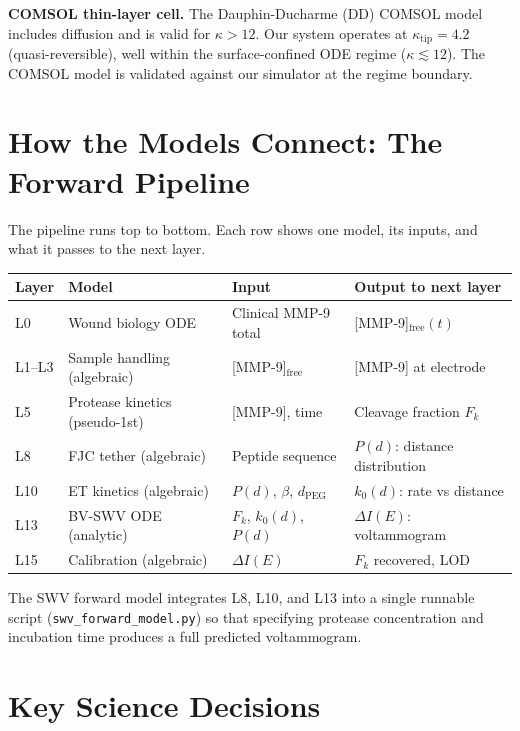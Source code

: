 \documentclass[10pt,a4paper]{article}
\numberwithin{equation}{section}
\begin{document}
\textbf{COMSOL thin-layer cell.} The Dauphin-Ducharme (DD) COMSOL model includes
diffusion and is valid for $\kappa > 12$. Our system operates at $\kappa_{\text{tip}} = 4.2$
(quasi-reversible), well within the surface-confined ODE regime ($\kappa \lesssim 12$).
The COMSOL model is validated against our simulator at the regime boundary.

\section{How the Models Connect: The Forward Pipeline}

\noindent
The pipeline runs top to bottom. Each row shows one model, its inputs, and what
it passes to the next layer.

\begin{center}
\small
\begin{tabular}{@{}llll@{}}
\toprule
\textbf{Layer} & \textbf{Model} & \textbf{Input} & \textbf{Output to next layer} \\
\midrule
L0 & Wound biology ODE & Clinical MMP-9 total & [MMP-9]$_{\text{free}}(t)$ \\
L1--L3 & Sample handling (algebraic) & [MMP-9]$_{\text{free}}$ & [MMP-9] at electrode \\
L5 & Protease kinetics (pseudo-1st) & [MMP-9], time & Cleavage fraction $F_k$ \\
L8 & FJC tether (algebraic) & Peptide sequence & $P(d)$: distance distribution \\
L10 & ET kinetics (algebraic) & $P(d)$, $\beta$, $d_{\text{PEG}}$ & $k_0(d)$: rate vs distance \\
L13 & BV-SWV ODE (analytic) & $F_k$, $k_0(d)$, $P(d)$ & $\Delta I(E)$: voltammogram \\
L15 & Calibration (algebraic) & $\Delta I(E)$ & $F_k$ recovered, LOD \\
\bottomrule
\end{tabular}
\end{center}

The SWV forward model integrates L8, L10, and L13 into a single runnable script
(\texttt{swv\_forward\_model.py}) so that specifying protease concentration and
incubation time produces a full predicted voltammogram.

\section{Key Science Decisions}
\end{document}
